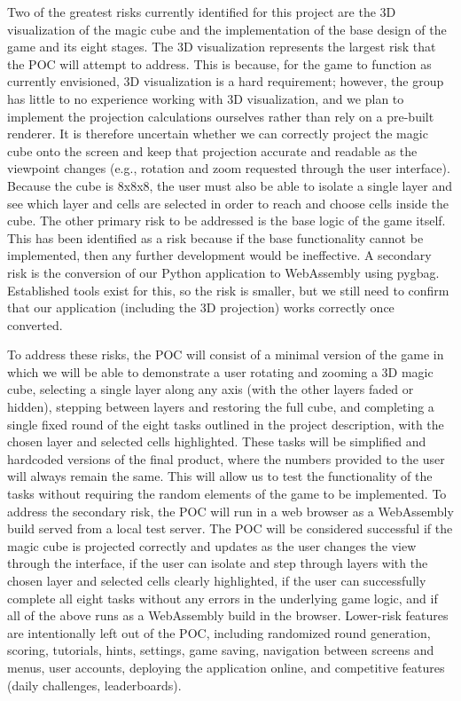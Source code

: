 \documentclass{article}
\begin{document}
Two of the greatest risks currently identified for this project are the 3D visualization of the magic cube and the implementation of the base design of the game and its eight stages. The 3D visualization represents the largest risk that the POC will attempt to address.
This is because, for the game to function as currently envisioned, 3D visualization is a hard requirement; however, the group has little to no experience working with 3D visualization, and we plan to implement the projection calculations ourselves rather than rely on a pre-built renderer. It is therefore uncertain whether we can correctly project the magic cube onto the screen and keep that projection accurate and readable as the viewpoint changes (e.g., rotation and zoom requested through the user interface). Because the cube is 8x8x8, the user must also be able to isolate a single layer and see which layer and cells are selected in order to reach and choose cells inside the cube. The other primary risk to be addressed is the base logic of the game itself.
This has been identified as a risk because if the base functionality cannot be implemented, then any further development would be ineffective.
A secondary risk is the conversion of our Python application to WebAssembly using pygbag. Established tools exist for this, so the risk is smaller, but we still need to confirm that our application (including the 3D projection) works correctly once converted.

To address these risks, the POC will consist of a minimal version of the game in which we will be able to demonstrate a user rotating and zooming a 3D magic cube, selecting a single layer along any axis (with the other layers faded or hidden), stepping between layers and restoring the full cube, and completing a single fixed round of the eight tasks outlined in the project description, with the chosen layer and selected cells highlighted.
These tasks will be simplified and hardcoded versions of the final product, where the numbers provided to the user will always remain the same. This will allow us to test the functionality of the tasks without requiring the random elements of the game to be implemented.
To address the secondary risk, the POC will run in a web browser as a WebAssembly build served from a local test server.
The POC will be considered successful if the magic cube is projected correctly and updates as the user changes the view through the interface, if the user can isolate and step through layers with the chosen layer and selected cells clearly highlighted, if the user can successfully complete all eight tasks without any errors in the underlying game logic, and if all of the above runs as a WebAssembly build in the browser.
Lower-risk features are intentionally left out of the POC, including randomized round generation, scoring, tutorials, hints, settings, game saving, navigation between screens and menus, user accounts, deploying the application online, and competitive features (daily challenges, leaderboards).
\end{document}
